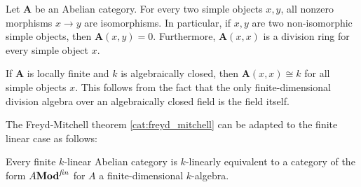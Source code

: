 
    \begin{theorem}
        Let $\mathbf{A}$ be an Abelian category. For every two simple objects $x,y$, all nonzero morphisms $x\rightarrow y$ are isomorphisms. In particular, if $x,y$ are two non-isomorphic simple objects, then $\mathbf{A}(x,y)=0$. Furthermore, $\mathbf{A}(x,x)$ is a division ring for every simple object $x$.
    \end{theorem}
    \begin{result}
        If $\mathbf{A}$ is locally finite and $k$ is algebraically closed, then $\mathbf{A}(x,x)\cong k$ for all simple objects $x$. This follows from the fact that the only finite-dimensional division algebra over an algebraically closed field is the field itself.
    \end{result}

    The Freyd-Mitchell theorem \ref{cat:freyd_mitchell} can be adapted to the finite linear case as follows:
    \begin{theorem}[Deligne]
        Every finite $k$-linear Abelian category is $k$-linearly equivalent to a category of the form $A\mathbf{Mod}^{\text{\emph{fin}}}$ for $A$ a finite-dimensional $k$-algebra.
    \end{theorem}

